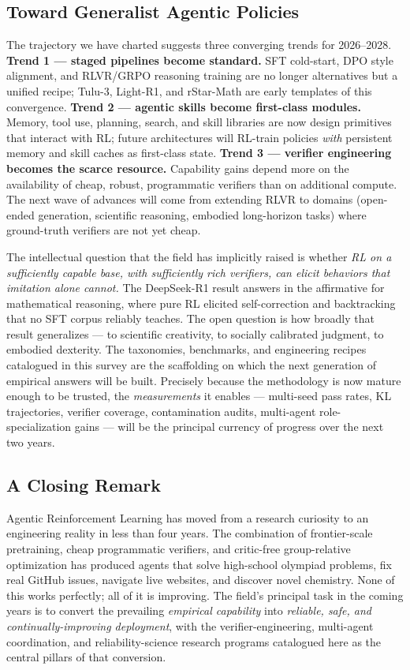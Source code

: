 \documentclass{article}
\begin{document}
\subsection{Toward Generalist Agentic Policies}\label{toward-generalist-agentic-policies}

The trajectory we have charted suggests three converging trends for 2026--2028. \textbf{Trend 1 --- staged pipelines become standard.} SFT cold-start, DPO style alignment, and RLVR/GRPO reasoning training are no longer alternatives but a unified recipe; Tulu-3, Light-R1, and rStar-Math are early templates of this convergence. \textbf{Trend 2 --- agentic skills become first-class modules.} Memory, tool use, planning, search, and skill libraries are now design primitives that interact with RL; future architectures will RL-train policies \emph{with} persistent memory and skill caches as first-class state. \textbf{Trend 3 --- verifier engineering becomes the scarce resource.} Capability gains depend more on the availability of cheap, robust, programmatic verifiers than on additional compute. The next wave of advances will come from extending RLVR to domains (open-ended generation, scientific reasoning, embodied long-horizon tasks) where ground-truth verifiers are not yet cheap.

The intellectual question that the field has implicitly raised is whether \emph{RL on a sufficiently capable base, with sufficiently rich verifiers, can elicit behaviors that imitation alone cannot.} The DeepSeek-R1 result answers in the affirmative for mathematical reasoning, where pure RL elicited self-correction and backtracking that no SFT corpus reliably teaches. The open question is how broadly that result generalizes --- to scientific creativity, to socially calibrated judgment, to embodied dexterity. The taxonomies, benchmarks, and engineering recipes catalogued in this survey are the scaffolding on which the next generation of empirical answers will be built. Precisely because the methodology is now mature enough to be trusted, the \emph{measurements} it enables --- multi-seed pass rates, KL trajectories, verifier coverage, contamination audits, multi-agent role-specialization gains --- will be the principal currency of progress over the next two years.

\subsection{A Closing Remark}\label{a-closing-remark}

Agentic Reinforcement Learning has moved from a research curiosity to an engineering reality in less than four years. The combination of frontier-scale pretraining, cheap programmatic verifiers, and critic-free group-relative optimization has produced agents that solve high-school olympiad problems, fix real GitHub issues, navigate live websites, and discover novel chemistry. None of this works perfectly; all of it is improving. The field's principal task in the coming years is to convert the prevailing \emph{empirical capability} into \emph{reliable, safe, and continually-improving deployment}, with the verifier-engineering, multi-agent coordination, and reliability-science research programs catalogued here as the central pillars of that conversion.
\end{document}
